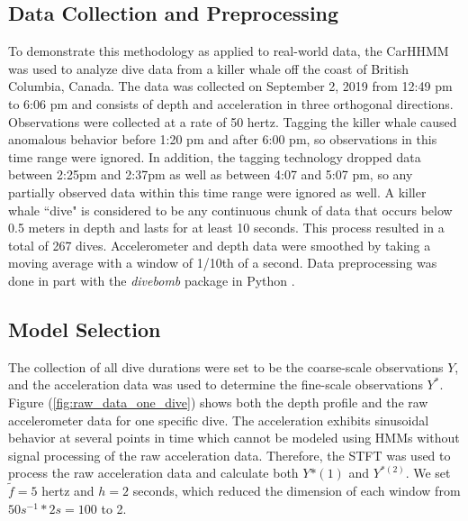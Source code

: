 

\subsection{Data Collection and Preprocessing}

To demonstrate this methodology as applied to real-world data, the CarHHMM was used to analyze dive data from a killer whale off the coast of British Columbia, Canada. The data was collected on September 2, 2019 from 12:49 pm to 6:06 pm and consists of depth and acceleration in three orthogonal directions. Observations were collected at a rate of 50 hertz. Tagging the killer whale caused anomalous behavior before 1:20 pm and after 6:00 pm, so observations in this time range were ignored. In addition, the tagging technology dropped data between 2:25pm and 2:37pm as well as between 4:07 and 5:07 pm, so any partially observed data within this time range were ignored as well. A killer whale ``dive" is considered to be any continuous chunk of data that occurs below 0.5 meters in depth and lasts for at least 10 seconds. This process resulted in a total of 267 dives. Accelerometer and depth data were smoothed by taking a moving average with a window of 1/10th of a second. Data preprocessing was done in part with the \textit{divebomb} package in Python \cite{Nunes:2018}.

\subsection{Model Selection}

The collection of all dive durations were set to be the coarse-scale observations $Y$, and the acceleration data was used to determine the fine-scale observations $Y^*$. Figure (\ref{fig:raw_data_one_dive}) shows both the depth profile and the raw accelerometer data for one specific dive. The acceleration exhibits sinusoidal behavior at several points in time which cannot be modeled using HMMs without signal processing of the raw acceleration data. Therefore, the STFT was used to process the raw acceleration data and calculate both $Y{*(1)}$ and $Y^{*(2)}$. We set $\tilde{f} = 5$ hertz and $h = 2$ seconds, which reduced the dimension of each window from $50 s^{-1} * 2 s = 100$ to 2.

